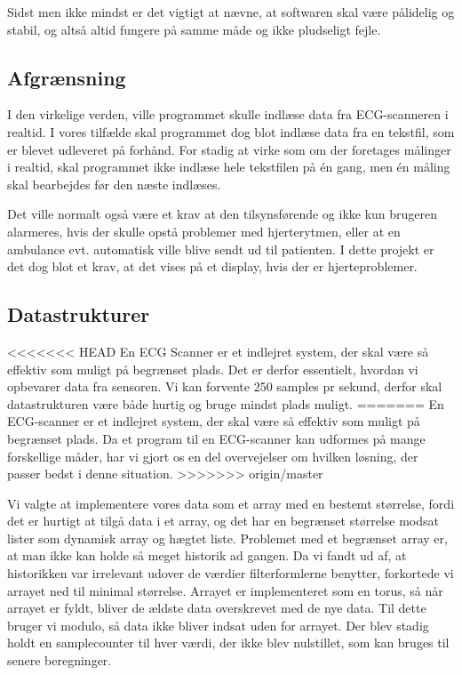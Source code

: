 \documentclass{article}
\begin{document}
Sidst men ikke mindst er det vigtigt at nævne, at softwaren skal være pålidelig og stabil, og altså altid fungere på samme måde og ikke pludseligt fejle.

\subsection{Afgrænsning}
I den virkelige verden, ville programmet skulle indlæse data fra ECG-scanneren i realtid. I vores tilfælde skal programmet dog blot indlæse data fra en tekstfil, som er blevet udleveret på forhånd. For stadig at virke som om der foretages målinger i realtid, skal programmet ikke indlæse hele tekstfilen på én gang, men én måling skal bearbejdes før den næste indlæses.

Det ville normalt også være et krav at den tilsynsførende og ikke kun brugeren alarmeres, hvis der skulle opstå problemer med hjerterytmen, eller at en ambulance evt. automatisk ville blive sendt ud til patienten. I dette projekt er det dog blot et krav, at det vises på et display, hvis der er hjerteproblemer.

\subsection{Datastrukturer}
<<<<<<< HEAD
En ECG Scanner er et indlejret system, der skal være så effektiv som muligt på begrænset plads. Det er derfor essentielt, hvordan vi opbevarer data fra sensoren. Vi kan forvente 250 samples pr sekund, derfor skal datastrukturen være både hurtig og bruge mindst plads muligt.
=======
En ECG-scanner er et indlejret system, der skal være så effektiv som muligt på begrænset plads. Da et program til en ECG-scanner kan udformes på mange forskellige måder, har vi gjort os en del overvejelser om hvilken løsning, der passer bedst i denne situation.
>>>>>>> origin/master


Vi valgte at implementere vores data som et array med en bestemt størrelse, fordi det er hurtigt at tilgå data i et array, og det har en begrænset størrelse modsat lister som dynamisk array og hægtet liste. Problemet med et begrænset array er, at man ikke kan holde så meget historik ad gangen. Da vi fandt ud af, at historikken var irrelevant udover de værdier filterformlerne benytter, forkortede vi arrayet ned til minimal størrelse.
Arrayet er implementeret som en torus, så når arrayet er fyldt, bliver de ældste data overskrevet med de nye data. Til dette bruger vi modulo, så data ikke bliver indsat uden for arrayet. 
Der blev stadig holdt en samplecounter til hver værdi, der ikke blev nulstillet, som kan bruges til senere beregninger.
\end{document}
